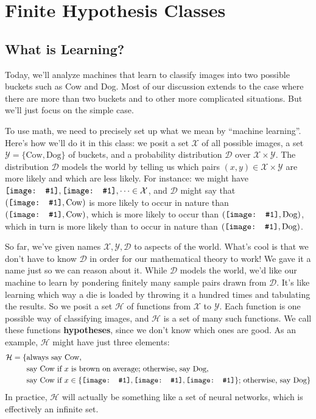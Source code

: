 \documentclass{article}
\newcommand{\Dd}{\mathcal{D}}
\newcommand{\Hh}{\mathcal{H}}
\newcommand{\Xx}{\mathcal{X}}
\newcommand{\Yy}{\mathcal{Y}}
\newcommand{\sdia}[1]{
\begingroup
\setbox0=\hbox{\texttt{[image: \#1]}}%
\parbox{\wd0}{\box0}\endgroup
}
\begin{document}
    \section{Finite Hypothesis Classes}
        \subsection{What is Learning?}
            Today, we'll analyze machines that learn to classify images into
            two possible buckets such as Cow and Dog.  Most of our discussion
            extends to the case where there are more than two buckets and to
            other more complicated situations.  But we'll just focus on the
            simple case.  

            To use math, we need to precisely set up what we mean by ``machine
            learning''.  Here's how we'll do it in this class: we posit a set
            $\Xx$ of all possible images, a set $\Yy=\{\text{Cow},\text{Dog}\}$
            of buckets, and a probability distribution $\Dd$ over $\Xx \times
            \Yy$.  The distribution $\Dd$ models the world by telling us which
            pairs $(x,y)\in \Xx\times \Yy$ are more likely and which are less
            likely.  For instance: we might have $\sdia{cow-a},
            \sdia{cow-d},\cdots \in \Xx$, and $\Dd$ might say that
            $(\sdia{cow-a}, \text{Cow})$ is more likely to occur in nature than 
            $(\sdia{cow-d}, \text{Cow})$, which is more likely to occur than
            $(\sdia{cow-d}, \text{Dog})$, which in turn is more likely than
            to occur in nature than
            $(\sdia{cow-a}, \text{Dog})$.

            So far, we've given names $\Xx, \Yy, \Dd$ to aspects of the world.
            What's cool is that we don't have to know $\Dd$ in order for our
            mathematical theory to work!  We gave it a name just so we can
            reason about it.  While $\Dd$ models the world, we'd like our
            machine to learn by pondering finitely many sample pairs drawn from
            $\Dd$.  It's like learning which way a die is loaded by throwing it
            a hundred times and tabulating the results.  So we posit a set
            $\Hh$ of functions from $\Xx$ to $\Yy$.  Each function is one
            possible way of classifying images, and $\Hh$ is a set of many such
            functions.  We call these functions \textbf{hypotheses}, since we
            don't know which ones are good.  
            As an example, $\Hh$ might have just three elements:
            \begin{align*}
                \Hh = \{
                    &\text{always say Cow}, \\
                    &\text{say Cow if $x$ is brown on average; otherwise, say Dog}, \\
                    &\text{say Cow if $x \in \{\sdia{cow-b}, \sdia{cow-c}, \sdia{cow-e}\}$;
                        otherwise, say Dog}
                \}
            \end{align*}
            In practice, $\Hh$ will actually be something like a set of neural
            networks, which is effectively an infinite set.
\end{document}
